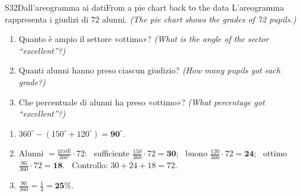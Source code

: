 \documentclass[11pt,a4paper]{article}
\newcommand{\enx}[1]{{\small\itshape\color{engray}(#1)}}
\begin{document}
\begin{esercizio}{S3}{2}{Dall'areogramma ai dati}{From a pie chart back to the data}
L'areogramma rappresenta i giudizi di $72$ alunni. \enx{The pie chart shows the grades of 72 pupils.}
\begin{center}
\end{center}
\begin{enumerate}
\item Quanto è ampio il settore «ottimo»? \enx{What is the angle of the sector ``excellent''?}
\item Quanti alunni hanno preso ciascun giudizio? \enx{How many pupils got each grade?}
\item Che percentuale di alunni ha preso «ottimo»? \enx{What percentage got ``excellent''?}
\end{enumerate}
\end{esercizio}
\begin{solbox}
\begin{enumerate}
\item $360^\circ-(150^\circ+120^\circ)=\mathbf{90^\circ}$.
\item Alunni $=\frac{\text{gradi}}{360^\circ}\cdot72$: \ sufficiente $\frac{150}{360}\cdot72=\mathbf{30}$; \ buono $\frac{120}{360}\cdot72=\mathbf{24}$; \ ottimo $\frac{90}{360}\cdot72=\mathbf{18}$. \ Controllo: $30+24+18=72$. \checkmark
\item $\frac{90}{360}=\frac14=\mathbf{25\%}$.
\end{enumerate}
\end{solbox}
\end{document}
